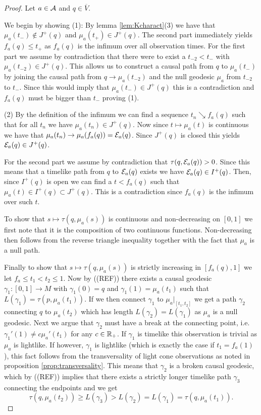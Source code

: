 \begin{proof}
Let $a\in \mathcal{A}$ and $q\in \overline{V}$.

We begin by showing (1): By lemma \ref{lem:Kcharact}(3) we have that
$\mu_a(t_-)\notin J^+(q)$ and $\mu_a(t_+)\in J^+(q)$. The second part immediately yields $f_a(q) \leq t_+$ as $f_a(q)$ is the infimum over all observation times. For the first part we assume by contradiction that there were to exist a $t_{-2}<t_-$ with $\mu_a(t_{-2})\in J^+(q)$. This allows us to construct a causal path from $q$ to $\mu_a(t_-)$ by joining the causal path from $q\to \mu_a(t_{-2})$ and the null geodesic $\mu_a$ from $t_{-2}$ to $t_-$. Since this would imply that $\mu_a(t_-)\in J^+(q)$ this is a contradiction and $f_a(q)$ must be bigger than $t_-$ proving (1).

(2)
By the definition of the infimum we can find a sequence $t_n\searrow f_a(q)$ such that for all $t_n$ we have $\mu_a(t_n)\in J^+(q)$. Now since $t\mapsto \mu_a(t)$ is continuous we have that $\mu_a(t_n)\to \mu_a(f_a(q)) = \mathcal{E}_a(q)$. Since $J^+(q)$ is closed this yields $\mathcal{E}_a(q)\in J^+(q)$. 

For the second part we assume by contradiction that $\tau(q,\mathcal{E}_a(q)) > 0$. Since this means that a timelike path from $q$ to $\mathcal{E}_a(q)$ exists we have $\mathcal{E}_a(q)\in I^+(q)$. Then, since $I^+(q)$ is open we can find a $t<f_a(q)$ such that $\mu_a(t)\in I^+(q) \subset J^+(q)$. This is a contradiction since $f_a(q)$ is the infimum over such $t$.

To show that $s\mapsto \tau(q,\mu_a(s))$ is continuous and non-decreasing on $[0,1]$ we first note that it is the composition of two continuous functions. Non-decreasing then follows from the reverse triangle inequality together with the fact that $\mu_a$ is a null path.

Finally to show that $s\mapsto \tau(q,\mu_a(s))$ is strictly increasing in $[f_a(q),1]$ we let $f_a\leq t_1<t_2\leq 1$. Now by ((REF)) there exists a causal geodesic $\gamma_1:[0,1]\to M$ with $\gamma_1(0)=q$ and $\gamma_1(1)=\mu_a(t_1)$ such that $L(\gamma_1)=\tau(p,\mu_a(t_1))$. 
If we then connect $\gamma_1$ to $\mu_a\rvert_{[t_1,t_2]}$ we get a path $\gamma_2$ connecting $q$ to $\mu_a(t_2)$ which has length $L(\gamma_2) = L(\gamma_1)$ as $\mu_a$ is a null geodesic. Next we argue that $\gamma_2$ must have a break at the connecting point, i.e. $\gamma_1'(1) \neq c\mu_a'(t_1)$ for any $c\in \mathbb{R}_+$. If $\gamma_1$ is timelike this observation is trivial as $\mu_a$ is lightlike. If however, $\gamma_1$ is lightlike (which is exactly the case if $t_1=f_a(1)$), this fact follows from the transversality of light cone observations as noted in proposition \ref{prop:transversality}. This means that $\gamma_2$ is a broken causal geodesic, which by ((REF)) implies that there exists a strictly longer timelike path $\gamma_3$ connecting the endpoints and we get
\[
\tau(q,\mu_a(t_2)) \geq L(\gamma_3) > L(\gamma_2) = L(\gamma_1) = \tau(q,\mu_a(t_1)).
\]


\end{proof}
